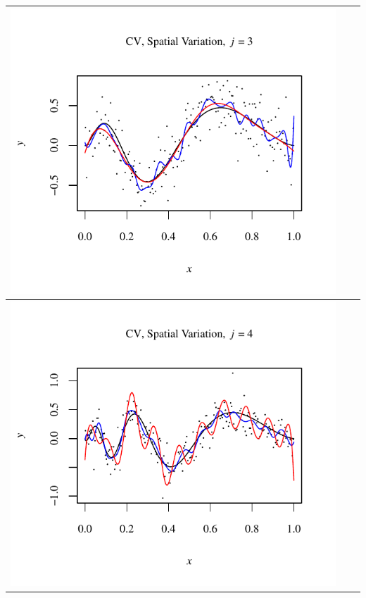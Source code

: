 \documentclass[11pt]{article}
\begin{document}
\begin{table}[h!]
\begin{center}
\begin{tabular}{| >{\centering\arraybackslash}m{2.1in} |  >{\centering\arraybackslash}m{2.1in} |  >{\centering\arraybackslash}m{2.1in}|}
      \includegraphics[width=1\linewidth,height=0.18\textheight]{Graphs/1/3/assignment5_a_1_3_3}\\\hline
      \includegraphics[width=1\linewidth,height=0.18\textheight]{Graphs/1/3/assignment5_a_1_3_4}&

\end{tabular}
\end{center}
\end{table}
\end{document}

